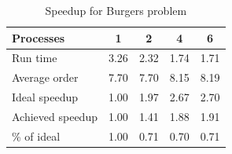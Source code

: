 \documentclass[12pt]{article}
\begin{document}
\begin{table}
\caption{Speedup for Burgers problem\label{tbl:Burgers}}{
\begin{tabular}{lcccc}\\
Processes & 1 & 2 & 4 & 6\\ \hline
Run time &  3.26 &  2.32 &  1.74 &  1.71 \\
Average order &  7.70 &  7.70 &  8.15 &  8.19 \\
Ideal speedup &  1.00 &  1.97 &  2.67 &  2.70 \\
Achieved speedup &  1.00 &  1.41 &  1.88 &  1.91 \\
\% of ideal &  1.00 &  0.71 &  0.70 &  0.71 \\ \hline
\end{tabular}}
\end{table}
\end{document}
